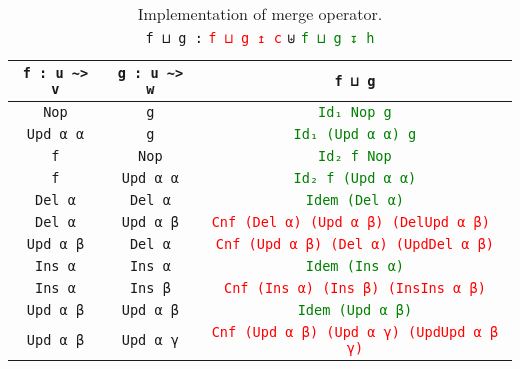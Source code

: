 \documentclass{sigplanconf}
\theoremstyle{plain}
\begin{document}
	\begin{table*}[t!]
	\centering
	\begin{tabular}{| c | c | c |}
	\hline
	\texttt{f : u \textasciitilde> v} & \texttt{g : u \textasciitilde> w} &  \texttt{f ⊔ g} 
	\\ \hline
	\texttt{Nop} & \texttt{g} & \textcolor{Green}{\texttt{Id₁ Nop g}} 
	\\ \hline
	\texttt{Upd α α} & \texttt{g} & \textcolor{Green}{\texttt{Id₁ (Upd α α) g}} 
	\\ \hline
	\texttt{f} & \texttt{Nop} & \textcolor{Green}{\texttt{Id₂ f Nop}} 
	\\ \hline
	\texttt{f} & \texttt{Upd α α} & \textcolor{Green}{\texttt{Id₂ f (Upd α α)}} 
	\\ \hline
	\texttt{Del α} & \texttt{Del α} & \textcolor{Green}{\texttt{Idem (Del α)}}
	\\ \hline
	\texttt{Del α} & \texttt{Upd α β} & \textcolor{Red}{\texttt{Cnf (Del α) (Upd α β) (DelUpd α β) }}
	\\ \hline
	\texttt{Upd α β} & \texttt{Del α} & \textcolor{Red}{\texttt{Cnf (Upd α β) (Del α) (UpdDel α β)}}
	\\ \hline
	\texttt{Ins α} & \texttt{Ins α} & \textcolor{Green}{\texttt{Idem (Ins α)}} 
	\\	\hline
	\texttt{Ins α} & \texttt{Ins β} & \textcolor{Red}{\texttt{Cnf (Ins α) (Ins β) (InsIns α β)}}
	\\	\hline
	\texttt{Upd α β} & \texttt{Upd α β} & \textcolor{Green}{\texttt{Idem (Upd α β)}}
	\\	\hline
	\texttt{Upd α β} & \texttt{Upd α γ} & \textcolor{Red}{\texttt{Cnf (Upd α β) (Upd α γ) (UpdUpd α β γ)}}
	\\ \hline
	\end{tabular}
	
	\captionsetup{singlelinecheck=false, justification=centering}

	\caption{Implementation of merge operator. \\
	 \texttt{f ⊔ g :} \textcolor{Red}{\texttt{f ⊔ g ↥ c}} \texttt{⊎} \textcolor{Green}{\texttt{f ⊔ g ↧ h}}}	 
	\label{table:merge}
	\end{table*}
\end{document}
